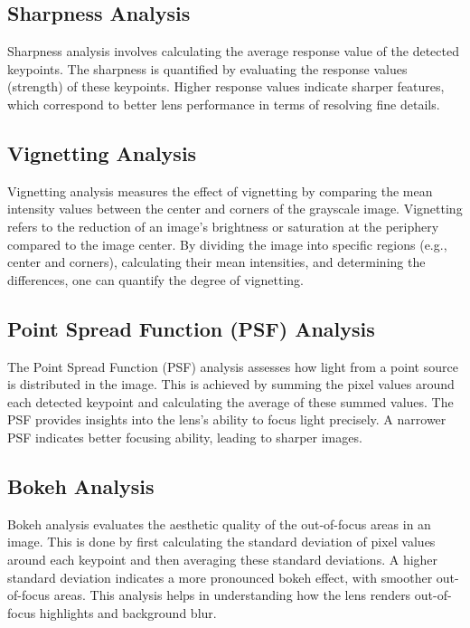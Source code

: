 \subsection{Sharpness Analysis}

Sharpness analysis involves calculating the average response value of the detected keypoints. The sharpness is quantified by evaluating the response values (strength) of these keypoints. Higher response values indicate sharper features, which correspond to better lens performance in terms of resolving fine details.

\subsection{Vignetting Analysis}

Vignetting analysis measures the effect of vignetting by comparing the mean intensity values between the center and corners of the grayscale image. Vignetting refers to the reduction of an image's brightness or saturation at the periphery compared to the image center. By dividing the image into specific regions (e.g., center and corners), calculating their mean intensities, and determining the differences, one can quantify the degree of vignetting.

\subsection{Point Spread Function (PSF) Analysis}

The Point Spread Function (PSF) analysis assesses how light from a point source is distributed in the image. This is achieved by summing the pixel values around each detected keypoint and calculating the average of these summed values. The PSF provides insights into the lens's ability to focus light precisely. A narrower PSF indicates better focusing ability, leading to sharper images.

\subsection{Bokeh Analysis}

Bokeh analysis evaluates the aesthetic quality of the out-of-focus areas in an image. This is done by first calculating the standard deviation of pixel values around each keypoint and then averaging these standard deviations. A higher standard deviation indicates a more pronounced bokeh effect, with smoother out-of-focus areas. This analysis helps in understanding how the lens renders out-of-focus highlights and background blur.


